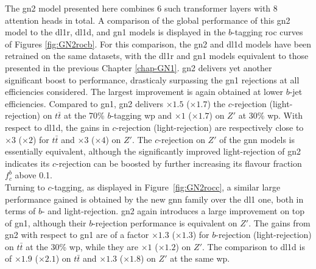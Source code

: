 The \gls{gn2} model presented here combines 6 such transformer layers with 8 attention heads in total. A comparison of the global performance of this \gls{gn2} model to the \gls{dl1r}, \gls{dl1d}, and \gls{gn1} models is displayed in the $b$-tagging \gls{roc} curves of Figures \ref{fig:GN2rocb}. For this comparison, the \gls{gn2} and \gls{dl1d} models have been retrained on the same datasets, with the \gls{dl1r} and \gls{gn1} models equivalent to those presented in the previous Chapter \ref{chap-GN1}. \gls{gn2} delivers yet another significant boost to performance, drasticaly surpassing the \gls{gn1} rejections at all efficiencies considered. The largest improvement is again obtained at lower $b$-jet efficiencies. Compared to \gls{gn1}, \gls{gn2} delivers $\times 1.5$ ($\times 1.7$) the $c$-rejection (light-rejection) on $t\bar{t}$ at the 70\% $b$-tagging \gls{wp} and $\times 1$ ($\times 1.7$) on $Z'$ at 30\% \gls{wp}. With respect to \gls{dl1d}, the gains in $c$-rejection (light-rejection) are respectively close to $\times 3$ ($\times 2$) for $t\bar{t}$ and $\times 3$ ($\times 4$) on $Z'$. The $c$-rejection on $Z'$ of the \gls{gnn} models is essentially equivalent, although the significantly improved light-rejection of \gls{gn2} indicates its $c$-rejection can be boosted by further increasing its flavour fraction $f^b_c$ above 0.1. \\

Turning to $c$-tagging, as displayed in Figure~\ref{fig:GN2rocc}, a similar large performance gained is obtained by the new \gls{gnn} family over the \gls{dl1} one, both in terms of $b$- and light-rejection. \gls{gn2} again introduces a large improvement on top of \gls{gn1}, although their $b$-rejection performance is equivalent on $Z'$. The gains from \gls{gn2} with respect to \gls{gn1} are of a factor $\times 1.3$ ($\times 1.3$) for $b$-rejection (light-rejection) on $t\bar{t}$ at the 30\% \gls{wp}, while they are $\times 1$ ($\times 1.2$) on $Z'$. The comparison to \gls{dl1d} is of $\times 1.9$ ($\times 2.1$) on $t\bar{t}$ and $\times 1.3$ ($\times 1.8$) on $Z'$ at the same \gls{wp}.

